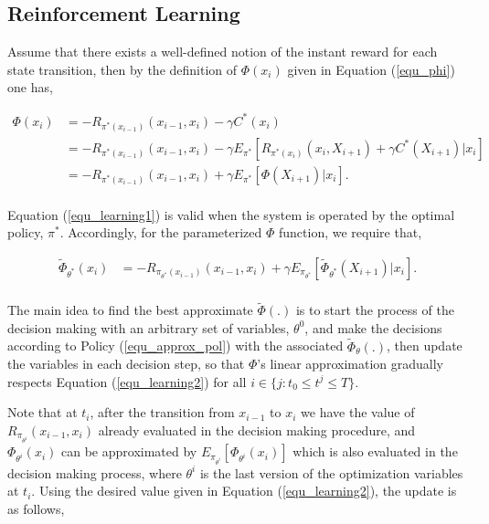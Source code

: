 \documentclass[12pt]{aastex62}
\theoremstyle{definition}
\begin{document}
\subsection{Reinforcement Learning}

Assume that there exists a well-defined notion of the instant reward for each state transition, then by the definition of $\Phi(x_{{i}})$ given in Equation (\ref{equ_phi}) one has,

\begin{equation} \label{equ_learning1}
\begin{aligned}
\Phi(x_{i}) &= - R_{\pi^*(x_{i-1})}(x_{i-1},x_i) - \gamma C^*({x_{i}})\\
&= - R_{\pi^*(x_{i-1})}(x_{i-1},x_i) - \gamma E_{\pi^*}[R_{\pi^*(x_{i})}(x_{i},X_{i+1})  +\gamma C^*({X_{{i+1}}})|x_i]\\
&= - R_{\pi^*(x_{i-1})}(x_{i-1},x_i)  + \gamma E_{\pi^*}[\Phi(X_{{i+1}})|x_i].\\
\end{aligned}
\end{equation}

Equation (\ref{equ_learning1}) is valid when the system is operated by the optimal policy, $\pi^*$. Accordingly, for the parameterized $\Phi$ function, we require that,


\begin{equation} \label{equ_learning2}
\begin{aligned}
\tilde \Phi_{\theta^*}(x_{i}) &=  - R_{\pi_{\theta^*}(x_{i-1})}(x_{i-1},x_i)  + \gamma E_{\pi_{\theta^*}}[\tilde \Phi_{\theta^*}(X_{{i+1}})|x_i].\\
\end{aligned}
\end{equation}

The main idea to find the best approximate $\tilde {\Phi}(.)$ is to start the process of the decision making with an arbitrary set of variables, $\theta^0$, and make the decisions according to Policy (\ref{equ_approx_pol}) with the associated $\tilde \Phi_{\theta}(.)$, then update the variables in each decision step, so that $\Phi$'s linear approximation gradually respects Equation (\ref{equ_learning2}) for all $i \in \{j: t_0 \leq t^j \leq T\}$.

Note that at $t_i$, after the transition from $x_{{i-1}}$ to $x_{{i}}$ we have the value of $R_{\pi_{\theta^i}}(x_{i-1},x_i) $ already evaluated in the decision making procedure, and  $\Phi_{\theta^i}(x_{i})$ can be approximated by $E_{\pi_{\theta^i}}[ \Phi_{\theta^i}(x_{i})]$ which is also evaluated in the decision making process, where $\theta^i$ is the last version of the optimization variables at $t_i$. Using the desired value given in Equation (\ref{equ_learning2}), the update is as follows,
\end{document}
